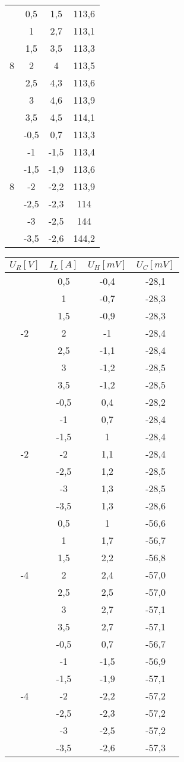 \documentclass[11pt]{article}
\begin{document}
\begin{multicols}{2}
\begin{tabular}{|c|c|c|c|}
\multirow{7}{*}{8} & 0,5 & 1,5 & 113,6 \\
& 1   & 2,7 & 113,1 \\
& 1,5 & 3,5 & 113,3 \\
& 2   & 4 & 113,5 \\
& 2,5 & 4,3 & 113,6 \\
& 3   & 4,6 & 113,9 \\
& 3,5 & 4,5 & 114,1 \\
\hline
\multirow{7}{*}{8} & -0,5 & 0,7 & 113,3 \\
& -1   & -1,5 & 113,4 \\
& -1,5 & -1,9 & 113,6 \\
& -2   & -2,2 & 113,9 \\
& -2,5 & -2,3 & 114 \\
& -3   & -2,5 & 144 \\
& -3,5 & -2,6 & 144,2 \\
\hline

\end{tabular}

\begin{tabular}{|c|c|c|c|}
\hline
$U_R[V]$ & $I_L[A]$ & $U_H[mV]$ & $U_C[mV]$ \\
\hline
\multirow{7}{*}{-2} & 0,5 & -0,4 & -28,1 \\
& 1   & -0,7 & -28,3 \\
& 1,5 & -0,9 & -28,3 \\
& 2   & -1 & -28,4 \\
& 2,5 & -1,1 & -28,4 \\
& 3   & -1,2 & -28,5 \\
& 3,5 & -1,2 & -28,5 \\
\hline
\multirow{7}{*}{-2} & -0,5 & 0,4 & -28,2 \\
& -1   & 0,7 & -28,4 \\
& -1,5 & 1 & -28,4 \\
& -2   & 1,1 & -28,4 \\
& -2,5 & 1,2 & -28,5 \\
& -3   & 1,3 & -28,5 \\
& -3,5 & 1,3 & -28,6 \\
\hline

\multirow{7}{*}{-4} & 0,5 & 1 & -56,6 \\
& 1   & 1,7 & -56,7 \\
& 1,5 & 2,2 & -56,8 \\
& 2   & 2,4 & -57,0 \\
& 2,5 & 2,5 & -57,0 \\
& 3   & 2,7 & -57,1 \\
& 3,5 & 2,7 & -57,1 \\
\hline
\multirow{7}{*}{-4} & -0,5 & 0,7 & -56,7 \\
& -1   & -1,5 & -56,9 \\
& -1,5 & -1,9 & -57,1 \\
& -2   & -2,2 & -57,2 \\
& -2,5 & -2,3 & -57,2 \\
& -3   & -2,5 & -57,2 \\
& -3,5 & -2,6 & -57,3 \\
\hline


\end{tabular}
\end{multicols}
\end{document}
